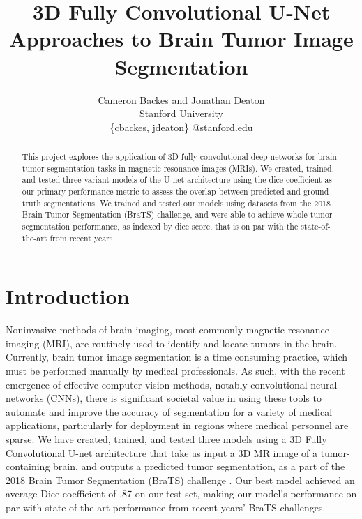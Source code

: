 \documentclass{article}
\title{3D Fully Convolutional U-Net Approaches to Brain Tumor Image Segmentation}
\author{
  Cameron Backes and Jonathan Deaton\\
  Stanford University\\
  \{cbackes,  jdeaton\} @stanford.edu\\
  }
\newcommand\tab[1][0.5cm]{\hspace*{#1}}
\begin{document}
\maketitle
\begin{abstract}
\noindent This project explores the application of 3D fully-convolutional deep networks for brain tumor segmentation tasks in magnetic resonance images (MRIs). We created, trained, and tested three variant models of the U-net architecture using the dice coefficient as our primary performance metric to assess the overlap between predicted and ground-truth segmentations. We trained and tested our models using datasets from the 2018 Brain Tumor Segmentation (BraTS) \cite{BraTS,BraTS2} challenge, and were able to achieve whole tumor segmentation performance, as indexed by dice score, that is on par with the state-of-the-art from recent years. 
\end{abstract}

\section{Introduction}	
\tab Noninvasive methods of brain imaging, most commonly magnetic resonance imaging (MRI), are routinely used to identify and locate tumors in the brain. Currently, brain tumor image segmentation is a time consuming practice, which must be performed manually by medical professionals. As such, with the recent emergence of effective computer vision methods, notably convolutional neural networks (CNNs), there is significant societal value in using these tools to automate and improve the accuracy of segmentation for a variety of medical applications, particularly for deployment in regions where medical personnel are sparse. We have created, trained, and tested three models using a 3D Fully Convolutional U-net architecture that take as input a 3D MR image of a tumor-containing brain, and outputs a predicted tumor segmentation, as a part of the 2018 Brain Tumor Segmentation (BraTS) challenge \cite{BraTSData}. Our best model achieved an average Dice coefficient of .87 on our test set, making our model’s performance on par with state-of-the-art performance from recent years’ BraTS challenges.
\end{document}
